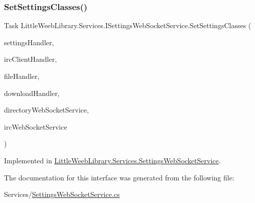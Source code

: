 \subsubsection{\texorpdfstring{Set\+Settings\+Classes()}{SetSettingsClasses()}}
{\footnotesize\ttfamily Task Little\+Weeb\+Library.\+Services.\+I\+Settings\+Web\+Socket\+Service.\+Set\+Settings\+Classes (\begin{DoxyParamCaption}\item[{\mbox{\hyperlink{interface_little_weeb_library_1_1_handlers_1_1_i_settings_handler}{I\+Settings\+Handler}}}]{settings\+Handler,  }\item[{\mbox{\hyperlink{interface_little_weeb_library_1_1_handlers_1_1_i_irc_client_handler}{I\+Irc\+Client\+Handler}}}]{irc\+Client\+Handler,  }\item[{\mbox{\hyperlink{interface_little_weeb_library_1_1_handlers_1_1_i_file_handler}{I\+File\+Handler}}}]{file\+Handler,  }\item[{\mbox{\hyperlink{interface_little_weeb_library_1_1_handlers_1_1_i_download_handler}{I\+Download\+Handler}}}]{download\+Handler,  }\item[{\mbox{\hyperlink{interface_little_weeb_library_1_1_services_1_1_i_directory_web_socket_service}{I\+Directory\+Web\+Socket\+Service}}}]{directory\+Web\+Socket\+Service,  }\item[{\mbox{\hyperlink{interface_little_weeb_library_1_1_services_1_1_i_irc_web_socket_service}{I\+Irc\+Web\+Socket\+Service}}}]{irc\+Web\+Socket\+Service }\end{DoxyParamCaption})}



Implemented in \mbox{\hyperlink{class_little_weeb_library_1_1_services_1_1_settings_web_socket_service_af799e00c29f6eec4ca8874cda559c225}{Little\+Weeb\+Library.\+Services.\+Settings\+Web\+Socket\+Service}}.



The documentation for this interface was generated from the following file\+:\begin{DoxyCompactItemize}
\item 
Services/\mbox{\hyperlink{_settings_web_socket_service_8cs}{Settings\+Web\+Socket\+Service.\+cs}}\end{DoxyCompactItemize}
